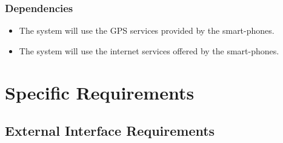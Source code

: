 \documentclass[titlepage]{article}
\begin{document}
\subsubsection{Dependencies }
\begin{itemize}
	\item The system will use the GPS services provided by the smart-phones.
	\item The system will use the internet services offered by the smart-phones.\\
\end{itemize}



\section{Specific Requirements}
\subsection{External Interface Requirements}
\end{document}

